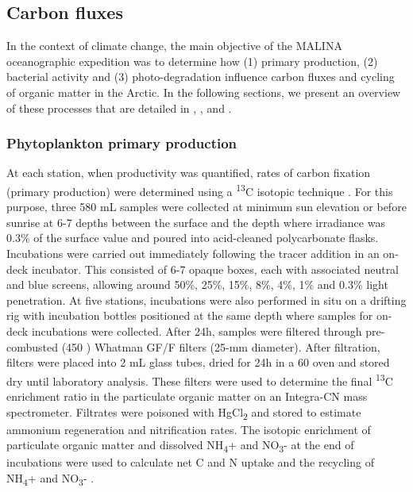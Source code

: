 \documentclass[essd, manuscript]{copernicus}
\begin{document}
\subsection{Carbon fluxes}

In the context of climate change, the main objective of the MALINA oceanographic expedition was to determine how (1) primary production, (2) bacterial activity and (3) photo-degradation influence carbon fluxes and cycling of organic matter in the Arctic. In the following sections, we present an overview of these processes that are detailed in \citet{Ortega-Retuerta2012a}, \citet{Xie2012}, \citet{Tremblay2014} and \citet{Link2013a}. 

\subsubsection{Phytoplankton primary production}

At each station, when productivity was quantified, rates of carbon fixation (primary production) were determined using a \textsuperscript{13}C isotopic technique \citep{Raimbault2008}. For this purpose, three 580 mL samples were collected at minimum sun elevation or before sunrise at 6-7 depths between the surface and the depth where irradiance was 0.3\% of the surface value and poured into acid-cleaned polycarbonate flasks. Incubations were carried out immediately following the tracer addition in an on-deck incubator. This consisted of 6-7 opaque boxes, each with associated neutral and blue screens, allowing around 50\%, 25\%, 15\%, 8\%, 4\%, 1\% and 0.3\% light penetration. At five stations, incubations were also performed in situ on a drifting rig with incubation bottles positioned at the same depth where samples for on-deck incubations were collected. After 24h, samples were filtered through pre-combusted (450 \textcelsius{}) Whatman GF/F filters (25-mm diameter). After filtration, filters were placed into 2 mL glass tubes, dried for 24h in a 60 \textcelsius{} oven and stored dry until laboratory analysis. These filters were used to determine the final \textsuperscript{13}C enrichment ratio in the particulate organic matter on an Integra-CN mass spectrometer. Filtrates were poisoned with HgCl\textsubscript{2} and stored to estimate ammonium regeneration and nitrification rates. The isotopic enrichment of particulate organic matter and dissolved NH\textsubscript{4}+ and NO\textsubscript{3}- at the end of incubations were used to calculate net C and N uptake and the recycling of NH\textsubscript{4}+ and NO\textsubscript{3}- \citep{Raimbault1999}.
\end{document}
